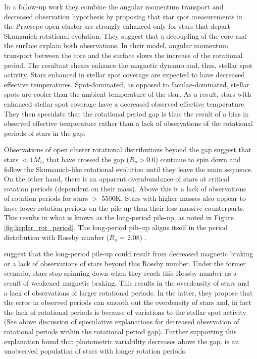 In a follow-up work \citep{cao_core-envelope_2023} they combine the angular momentum transport and decreased observation hypothesis by proposing
that star spot measurements in the Praesepe open cluster are strongly enhanced only for stars that depart Skumanich rotational evolution.
They suggest that a decoupling of the core and the surface explain both observations.
In their model, angular momentum transport between the core and the surface slows the increase of the rotational period. 
The resultant shears enhance the magnetic dynamo and, thus, stellar spot activity.
Stars enhanced in stellar spot coverage are expected to have decreased effective temperatures.
Spot-dominated, as opposed to faculae-dominated, stellar spots are cooler than the ambient temperature of the star.
As a result, stars with enhanced stellar spot coverage have a decreased observed effective temperature.
They then speculate that the rotational period gap is thus the result of a bias in observed effective temperature rather than a lack of observations of the rotational periods of stars in the gap.

Observations of open cluster rotational distributions beyond the gap suggest that stars $<1M_{\odot}$ that have crossed the gap ($R_o>$0.6) continue to spin down and follow the Skumanich-like rotational evolution until they leave the main sequence.
On the other hand, there is an apparent overabundance of stars at critical rotation periods (dependent on their mass). 
Above this is a lack of observations of rotation periods for stars $>$ 5500K.
Stars with higher masses also appear to have lower rotation periods on the pile-up than their less massive counterparts.
This results in what is known as the long-period pile-up, as noted in Figure \ref{fig:kepler_rot_period}.
The long-period pile-up aligns itself in the \citet{mcquillan_rotation_2014} period distribution with Rossby number  ($R_o$ = 2.08) \citep{van_saders_forward_2019}.
 
\citet{van_saders_forward_2019} suggest that the long-period pile-up could result from decreased magnetic braking or a lack of observations of stars beyond this Rossby number.
Under the former scenario, stars stop spinning down when they reach this Rossby number as a result of weakened magnetic braking.
This results in the overdensity of stars and a lack of observations of larger rotational periods.
In the latter, they propose that the error in observed periods can smooth out the overdensity of stars and, in fact the lack of rotational periods is because of variations to the stellar spot activity (See above discussion of speculative explanations for decreased observation of rotational periods within the rotational period gap).
Further supporting this explanation \citet{david_further_2022} found that photometric variability decreases above the gap.
 is an unobserved population of stars with longer rotation periods.

